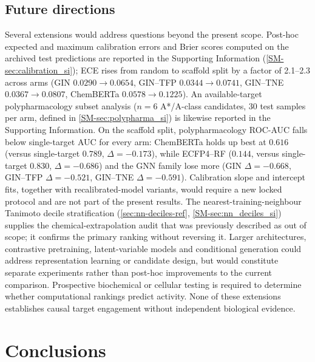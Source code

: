 \documentclass[11pt,a4paper]{article}
\begin{document}
\subsection{Future directions}

Several extensions would address questions beyond the present scope. Post-hoc expected and maximum calibration errors and Brier scores computed on the archived test predictions are reported in the Supporting Information (\cref{SM-sec:calibration_si}); ECE rises from random to scaffold split by a factor of \numrange{2.1}{2.3} across arms (GIN $\num{0.0290} \to \num{0.0654}$, GIN--TFP $\num{0.0344} \to \num{0.0741}$, GIN--TNE $\num{0.0367} \to \num{0.0807}$, ChemBERTa $\num{0.0578} \to \num{0.1225}$). An available-target polypharmacology subset analysis ($n=6$ A*/A-class candidates, $\num{30}$ test samples per arm, defined in \cref{SM-sec:polypharma_si}) is likewise reported in the Supporting Information. On the scaffold split, polypharmacology ROC-AUC falls below single-target AUC for every arm: ChemBERTa holds up best at $\num{0.616}$ (versus single-target $\num{0.789}$, $\Delta = -\num{0.173}$), while ECFP4--RF ($\num{0.144}$, versus single-target $\num{0.830}$, $\Delta = -\num{0.686}$) and the GNN family lose more (GIN $\Delta = -\num{0.668}$, GIN--TFP $\Delta = -\num{0.521}$, GIN--TNE $\Delta = -\num{0.591}$). Calibration slope and intercept fits, together with recalibrated-model variants, would require a new locked protocol and are not part of the present results. The nearest-training-neighbour Tanimoto decile stratification (\cref{sec:nn-deciles-ref}, \cref{SM-sec:nn_deciles_si}) supplies the chemical-extrapolation audit that was previously described as out of scope; it confirms the primary ranking without reversing it. Larger architectures, contrastive pretraining, latent-variable models and conditional generation could address representation learning or candidate design, but would constitute separate experiments rather than post-hoc improvements to the current comparison. Prospective biochemical or cellular testing is required to determine whether computational rankings predict activity. None of these extensions establishes causal target engagement without independent biological evidence.

\section{Conclusions}
\end{document}
